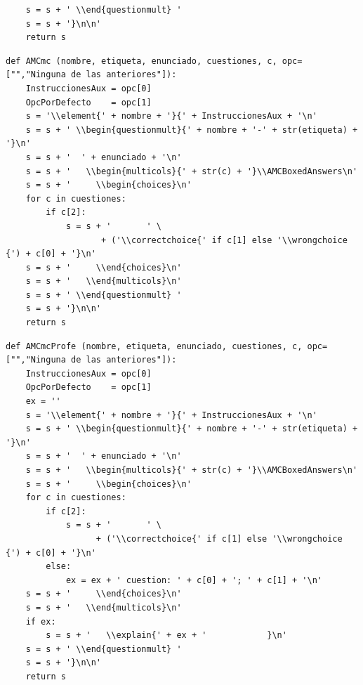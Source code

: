 \documentclass[10pt,a4paper]{report}
\begin{document}
\begin{enumerate}
\begin{verbatim}
    s = s + ' \\end{questionmult} '
    s = s + '}\n\n'
    return s
\end{verbatim}

\begin{verbatim}
def AMCmc (nombre, etiqueta, enunciado, cuestiones, c, opc=["","Ninguna de las anteriores"]):
    InstruccionesAux = opc[0]
    OpcPorDefecto    = opc[1]
    s = '\\element{' + nombre + '}{' + InstruccionesAux + '\n'
    s = s + ' \\begin{questionmult}{' + nombre + '-' + str(etiqueta) + '}\n'
    s = s + '  ' + enunciado + '\n'
    s = s + '   \\begin{multicols}{' + str(c) + '}\\AMCBoxedAnswers\n'
    s = s + '     \\begin{choices}\n'
    for c in cuestiones:
        if c[2]:
            s = s + '       ' \
                   + ('\\correctchoice{' if c[1] else '\\wrongchoice  {') + c[0] + '}\n'
    s = s + '     \\end{choices}\n'
    s = s + '   \\end{multicols}\n'
    s = s + ' \\end{questionmult} '
    s = s + '}\n\n'
    return s
\end{verbatim}

\begin{verbatim}
def AMCmcProfe (nombre, etiqueta, enunciado, cuestiones, c, opc=["","Ninguna de las anteriores"]):
    InstruccionesAux = opc[0]
    OpcPorDefecto    = opc[1]
    ex = ''
    s = '\\element{' + nombre + '}{' + InstruccionesAux + '\n'
    s = s + ' \\begin{questionmult}{' + nombre + '-' + str(etiqueta) + '}\n'
    s = s + '  ' + enunciado + '\n'
    s = s + '   \\begin{multicols}{' + str(c) + '}\\AMCBoxedAnswers\n'
    s = s + '     \\begin{choices}\n'
    for c in cuestiones:
        if c[2]:
            s = s + '       ' \
                  + ('\\correctchoice{' if c[1] else '\\wrongchoice  {') + c[0] + '}\n'
        else:
            ex = ex + ' cuestion: ' + c[0] + '; ' + c[1] + '\n'
    s = s + '     \\end{choices}\n'
    s = s + '   \\end{multicols}\n'
    if ex:
        s = s + '   \\explain{' + ex + '            }\n'
    s = s + ' \\end{questionmult} '
    s = s + '}\n\n'
    return s
\end{verbatim}


\end{enumerate}
\end{document}
